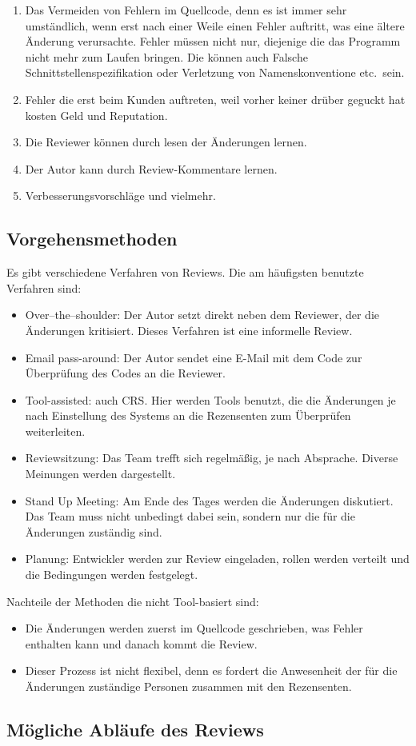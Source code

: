 \begin{enumerate}
	\item Das Vermeiden von Fehlern im Quellcode, denn es ist immer sehr umständlich, wenn erst nach einer Weile einen Fehler auftritt, was eine ältere Änderung verursachte.
		Fehler müssen nicht nur, diejenige die das Programm nicht mehr zum Laufen bringen. Die können auch Falsche Schnittstellenspezifikation oder Verletzung von Namenskonventione 
		etc.\ sein.
	\item Fehler die erst beim Kunden auftreten, weil vorher keiner drüber geguckt hat kosten Geld und Reputation.
	\item Die Reviewer können durch lesen der Änderungen lernen.
	\item Der Autor kann durch Review-Kommentare lernen.
	\item Verbesserungsvorschläge und vielmehr.
\end{enumerate}

\subsection{Vorgehensmethoden}
\label{subsec:Vorgehensmethoden}
Es gibt verschiedene Verfahren von Reviews. Die am häufigsten benutzte Verfahren sind:

\begin{itemize}
	\item Over–the–shoulder: Der Autor setzt direkt neben dem Reviewer, der die Änderungen kritisiert. Dieses Verfahren ist eine informelle Review.
	\item Email pass-around: Der Autor sendet eine E-Mail mit dem Code zur Überprüfung des Codes an die Reviewer.
	\item Tool-assisted: auch \ac{CRS}. Hier werden Tools benutzt, die die Änderungen je nach Einstellung des Systems an die Rezensenten zum Überprüfen weiterleiten.
	\item Reviewsitzung: Das Team trefft sich regelmäßig, je nach Absprache. Diverse Meinungen werden dargestellt.
	\item Stand Up Meeting: Am Ende des Tages werden die Änderungen diskutiert. Das Team muss nicht unbedingt dabei sein, sondern nur die für die Änderungen zuständig sind.
	\item Planung: Entwickler werden zur Review eingeladen, rollen werden verteilt und die Bedingungen werden festgelegt.
\end{itemize}

Nachteile der Methoden die nicht Tool-basiert sind:
\begin{itemize}
	\item Die Änderungen werden zuerst im Quellcode geschrieben, was Fehler enthalten kann und danach kommt die Review.
	\item Dieser Prozess ist nicht flexibel, denn es fordert die Anwesenheit der für die Änderungen zuständige Personen zusammen mit den Rezensenten.
\end{itemize}

\subsection{Mögliche Abläufe des Reviews}
\label{sec:review abläufe}

